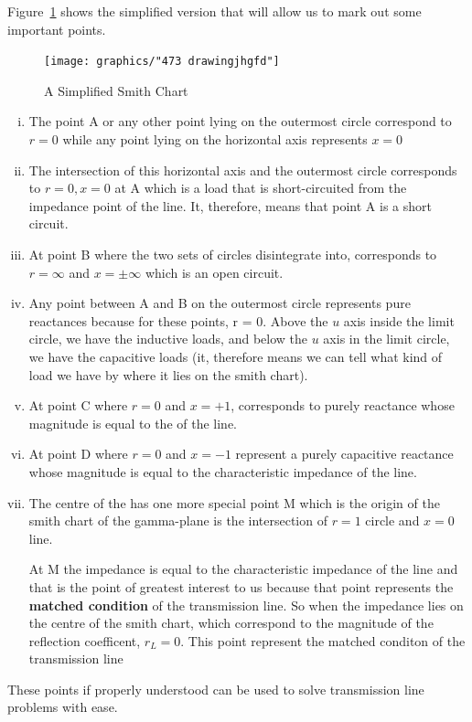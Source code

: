 Figure~\ref{fig:473-drawingjhgfd} shows the simplified version that will allow us to mark out some important points.
\begin{figure}[h]
\centering
\texttt{[image: graphics/"473 drawingjhgfd"]}
\caption{A Simplified Smith Chart}
\label{fig:473-drawingjhgfd}
\end{figure}

\begin{enumerate}[(i)]
\item The point A or any other point lying on the outermost circle correspond to $r = 0$ while any point lying on the horizontal axis represents $x = 0$

\item The intersection of this horizontal axis and the outermost circle corresponds to $r = 0,x = 0$ at A which is a load that is short-circuited from the impedance point of the line. It, therefore, means that point A is a short circuit.

\item At point B where the two sets of circles disintegrate into, corresponds to $r = \infty$ and $x = \pm\infty $ which is an open circuit.

\item Any point between A and B on the outermost circle represents pure reactances because for these points, r = 0. Above the $u$ axis inside the limit circle, we have the inductive loads, and below the $u$ axis in the limit circle, we have the capacitive loads (it, therefore means we can tell what kind of load we have by where it lies on the smith chart).

\item At point C where $r = 0$ and $x = +1$, corresponds to purely reactance whose magnitude is equal to the  of the line.

\item At point D where $r = 0$ and $x = -1$ represent a purely capacitive reactance whose magnitude is equal to the characteristic impedance of the line.

\item The centre of the  has one more special point M which is the origin of the smith chart of the gamma-plane is the intersection of $r = 1$ circle and $x = 0$ line.

At M the impedance is equal to the characteristic impedance of the line and that is the point of greatest interest to us because that point represents the \textbf{matched condition} of the transmission line. So when the impedance lies on the centre of the smith chart, which correspond to the magnitude of the reflection coefficent, $r_L = 0$. This point represent the matched conditon of the transmission line
\end{enumerate}
These points if properly understood can be used to solve transmission line problems with ease.

